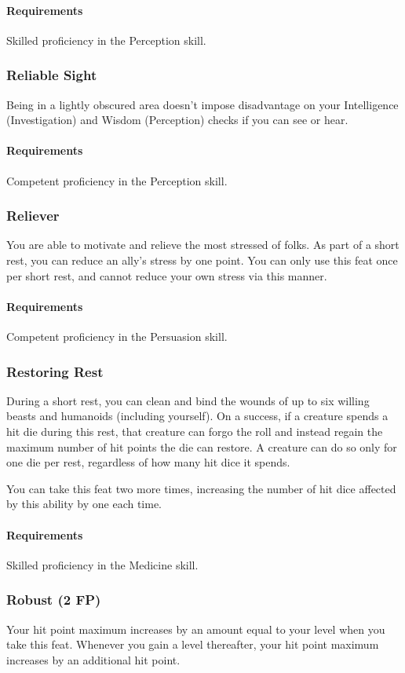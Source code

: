     \paragraph{Requirements} Skilled proficiency in the Perception skill.
\subsubsection{Reliable Sight} \label{feat::reliablesight}
    Being in a lightly obscured area doesn't impose disadvantage on your Intelligence (Investigation) and Wisdom (Perception) checks if you can see or hear.
    \paragraph{Requirements} Competent proficiency in the Perception skill.
\subsubsection{Reliever} \label{feat::reliever}
    You are able to motivate and relieve the most stressed of folks.
    As part of a short rest, you can reduce an ally's stress by one point.
    You can only use this feat once per short rest, and cannot reduce your own stress via this manner.
    \paragraph{Requirements} Competent proficiency in the Persuasion skill.
\subsubsection{Restoring Rest} \label{feat::restoringrest}
    During a short rest, you can clean and bind the wounds of up to six willing beasts and humanoids (including yourself).
    On a success, if a creature spends a hit die during this rest, that creature can forgo the roll and instead regain the maximum number of hit points the die can restore.
    A creature can do so only for one die per rest, regardless of how many hit dice it spends.

    You can take this feat two more times, increasing the number of hit dice affected by this ability by one each time.
    \paragraph{Requirements} Skilled proficiency in the Medicine skill.
\subsubsection{Robust (2 FP)} \label{feat::robust}
    Your hit point maximum increases by an amount equal to your level when you take this feat.
    Whenever you gain a level thereafter, your hit point maximum increases by an additional hit point.
